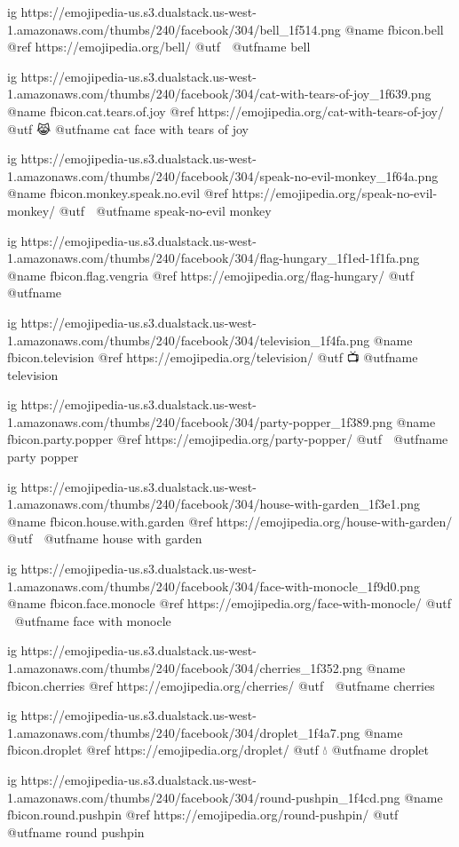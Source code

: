 	ig https://emojipedia-us.s3.dualstack.us-west-1.amazonaws.com/thumbs/240/facebook/304/bell_1f514.png
	@name fbicon.bell
	@ref https://emojipedia.org/bell/
	@utf 🔔
	@utfname bell

	ig https://emojipedia-us.s3.dualstack.us-west-1.amazonaws.com/thumbs/240/facebook/304/cat-with-tears-of-joy_1f639.png
	@name fbicon.cat.tears.of.joy
	@ref https://emojipedia.org/cat-with-tears-of-joy/
	@utf 😹
	@utfname cat face with tears of joy

	ig https://emojipedia-us.s3.dualstack.us-west-1.amazonaws.com/thumbs/240/facebook/304/speak-no-evil-monkey_1f64a.png
	@name fbicon.monkey.speak.no.evil
	@ref https://emojipedia.org/speak-no-evil-monkey/
	@utf 🙊
	@utfname speak-no-evil monkey

	ig https://emojipedia-us.s3.dualstack.us-west-1.amazonaws.com/thumbs/240/facebook/304/flag-hungary_1f1ed-1f1fa.png
	@name fbicon.flag.vengria
	@ref https://emojipedia.org/flag-hungary/
	@utf
	@utfname

	ig https://emojipedia-us.s3.dualstack.us-west-1.amazonaws.com/thumbs/240/facebook/304/television_1f4fa.png
	@name fbicon.television
	@ref https://emojipedia.org/television/
	@utf 📺
	@utfname television

	ig https://emojipedia-us.s3.dualstack.us-west-1.amazonaws.com/thumbs/240/facebook/304/party-popper_1f389.png
	@name fbicon.party.popper
	@ref https://emojipedia.org/party-popper/
	@utf 🎉
	@utfname party popper

	ig https://emojipedia-us.s3.dualstack.us-west-1.amazonaws.com/thumbs/240/facebook/304/house-with-garden_1f3e1.png
	@name fbicon.house.with.garden
	@ref https://emojipedia.org/house-with-garden/
	@utf 🏡
	@utfname house with garden

	ig https://emojipedia-us.s3.dualstack.us-west-1.amazonaws.com/thumbs/240/facebook/304/face-with-monocle_1f9d0.png
	@name fbicon.face.monocle
	@ref https://emojipedia.org/face-with-monocle/
	@utf 🧐
	@utfname face with monocle

	ig https://emojipedia-us.s3.dualstack.us-west-1.amazonaws.com/thumbs/240/facebook/304/cherries_1f352.png
	@name fbicon.cherries
	@ref https://emojipedia.org/cherries/
	@utf 🍒
	@utfname cherries

	ig https://emojipedia-us.s3.dualstack.us-west-1.amazonaws.com/thumbs/240/facebook/304/droplet_1f4a7.png
	@name fbicon.droplet
	@ref https://emojipedia.org/droplet/
	@utf 💧
	@utfname droplet

	ig https://emojipedia-us.s3.dualstack.us-west-1.amazonaws.com/thumbs/240/facebook/304/round-pushpin_1f4cd.png
	@name fbicon.round.pushpin
	@ref https://emojipedia.org/round-pushpin/
	@utf 📍
	@utfname round pushpin

